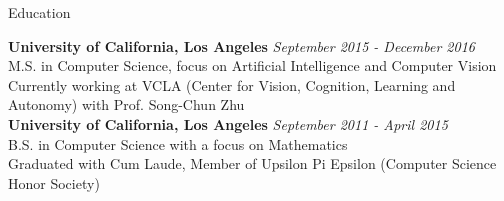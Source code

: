 \documentclass{resume} %
\begin{document}

\begin{rSection}{Education}

{\bf University of California, Los Angeles} \hfill {\em September 2015 - December 2016} \\ 
M.S. in Computer Science, focus on Artificial Intelligence and Computer Vision \\
Currently working at VCLA (Center for Vision, Cognition, Learning and Autonomy) with Prof. Song-Chun Zhu \\
\newline
{\bf University of California, Los Angeles} \hfill {\em September 2011 - April 2015} \\
B.S. in Computer Science with a focus on Mathematics \\
Graduated with Cum Laude, Member of Upsilon Pi Epsilon (Computer Science Honor Society)
\end{rSection}

\end{document}
